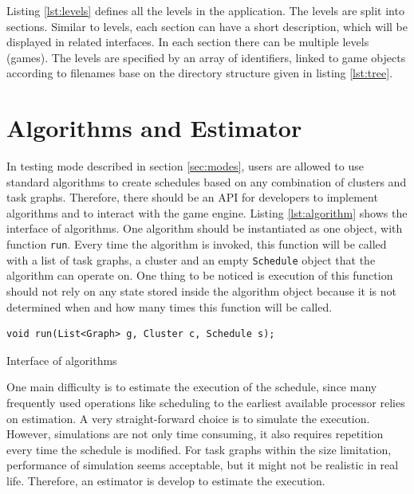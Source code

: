 \documentclass[msc,deptreport, cs]{infthesis}
\begin{document}
Listing \ref{lst:levels} defines all the levels in the application. The levels are split into sections. Similar to levels, each section can have a short description, which will be displayed in related interfaces. In each section there can be multiple levels (games). The levels are specified by an array of identifiers, linked to game objects according to filenames base on the directory structure given in listing \ref{lst:tree}.

\section{Algorithms and Estimator}

In testing mode described in section \ref{sec:modes}, users are allowed to use standard algorithms to create schedules based on any combination of clusters and task graphs. Therefore, there should be an API for developers to implement algorithms and to interact with the game engine. Listing \ref{lst:algorithm} shows the interface of algorithms. One algorithm should be instantiated as one object, with function \verb+run+. Every time the algorithm is invoked, this function will be called with a list of task graphs, a cluster and an empty \verb+Schedule+ object that the algorithm can operate on. One thing to be noticed is execution of this function should not rely on any state stored inside the algorithm object because it is not determined when and how many times this function will be called.

\vspace{0.5em}
\begin{lstfloat}
  \begin{lstlisting}
void run(List<Graph> g, Cluster c, Schedule s);
  \end{lstlisting}
  \caption{Interface of algorithms}
  \label{lst:algorithm}
  \vspace{-1em}
\end{lstfloat} 
\vspace{-0.5em}

One main difficulty is to estimate the execution of the schedule, since many frequently used operations like scheduling to the earliest available processor relies on estimation. A very straight-forward choice is to simulate the execution. However, simulations are not only time consuming, it also requires repetition every time the schedule is modified. For task graphs within the size limitation, performance of simulation seems acceptable, but it might not be realistic in real life. Therefore, an estimator is develop to estimate the execution.
\end{document}
